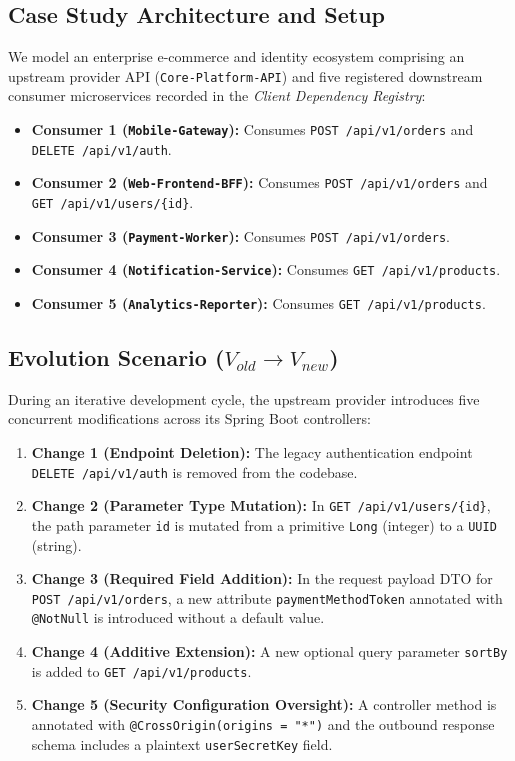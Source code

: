 \documentclass[conference]{IEEEtran}
\begin{document}
\subsection{Case Study Architecture and Setup}
We model an enterprise e-commerce and identity ecosystem comprising an upstream provider API (\texttt{Core-Platform-API}) and five registered downstream consumer microservices recorded in the \textit{Client Dependency Registry}:
\begin{itemize}
    \item \textbf{Consumer 1 (\texttt{Mobile-Gateway}):} Consumes \texttt{POST /api/v1/orders} and \texttt{DELETE /api/v1/auth}.
    \item \textbf{Consumer 2 (\texttt{Web-Frontend-BFF}):} Consumes \texttt{POST /api/v1/orders} and \texttt{GET /api/v1/users/\{id\}}.
    \item \textbf{Consumer 3 (\texttt{Payment-Worker}):} Consumes \texttt{POST /api/v1/orders}.
    \item \textbf{Consumer 4 (\texttt{Notification-Service}):} Consumes \texttt{GET /api/v1/products}.
    \item \textbf{Consumer 5 (\texttt{Analytics-Reporter}):} Consumes \texttt{GET /api/v1/products}.
\end{itemize}

\subsection{Evolution Scenario ($V_{old} \to V_{new}$)}
During an iterative development cycle, the upstream provider introduces five concurrent modifications across its Spring Boot controllers:
\begin{enumerate}
    \item \textbf{Change 1 (Endpoint Deletion):} The legacy authentication endpoint \texttt{DELETE /api/v1/auth} is removed from the codebase.
    \item \textbf{Change 2 (Parameter Type Mutation):} In \texttt{GET /api/v1/users/\{id\}}, the path parameter \texttt{id} is mutated from a primitive \texttt{Long} (integer) to a \texttt{UUID} (string).
    \item \textbf{Change 3 (Required Field Addition):} In the request payload DTO for \texttt{POST /api/v1/orders}, a new attribute \texttt{paymentMethodToken} annotated with \texttt{@NotNull} is introduced without a default value.
    \item \textbf{Change 4 (Additive Extension):} A new optional query parameter \texttt{sortBy} is added to \texttt{GET /api/v1/products}.
    \item \textbf{Change 5 (Security Configuration Oversight):} A controller method is annotated with \texttt{@CrossOrigin(origins = "*")} and the outbound response schema includes a plaintext \texttt{userSecretKey} field.
\end{enumerate}
\end{document}
